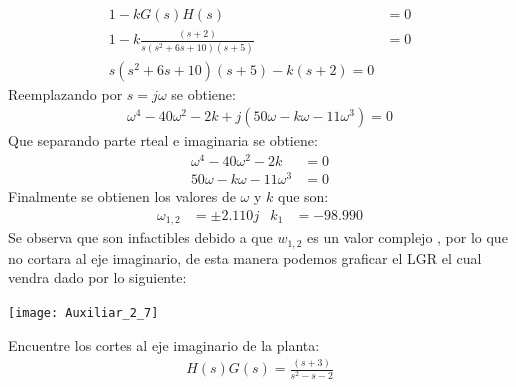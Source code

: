 \documentclass[
  11pt,
  letterpaper,
   addpoints,
  ]{exam}
\begin{document}
\begin{questions}
\begin{solution}
\begin{align}
    1-kG(s)H(s) &= 0\\
    1-k\frac{(s+2)}{s(s^{2}+6s+10)(s+5)} &= 0\\
    s(s^{2}+6s+10)(s+5)-k(s+2)=0
\end{align}
Reemplazando por $s=j\omega$ se obtiene:
\begin{align}
    \omega^{4}-40\omega^{2}-2k + j(50\omega -k\omega-11\omega^{3})=0
\end{align}
Que separando parte rteal e imaginaria se obtiene:
\begin{align}
    \omega^{4}-40\omega^{2}-2k &= 0\\
    50\omega -k\omega-11\omega^{3} &= 0
\end{align}
Finalmente se obtienen los valores de $\omega$ y $k$ que son:
\begin{align}
    \omega_{1,2} &= \pm 2.110j & k_{1}&= -98.990
\end{align}
Se observa que son infactibles debido a que $w_{1,2}$ es un valor complejo , por lo que no cortara al eje imaginario, de esta manera podemos graficar el LGR el cual vendra dado por lo siguiente:
\begin{center}
    \texttt{[image: Auxiliar\_2\_7]}
  \end{center}
\end{solution}
\question Encuentre los cortes al eje imaginario de la planta:
\begin{align}
    H(s)G(s) = \frac{(s+3)}{s^{2}-s-2}
\end{align}
\begin{solution}

\end{solution}
\end{questions}
\end{document}
